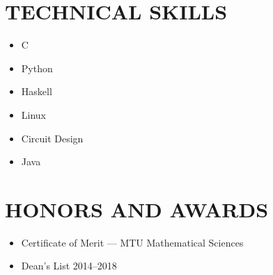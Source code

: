 \documentclass[letterpaper]{res}
\begin{document}
\begin{resume}
  \section{TECHNICAL SKILLS}
  \vspace{-1pt}
  \begin{multicols}{3}
    \begin{itemize} \itemsep1pt \parskip0pt 
      \item C
      \item Python
      \item Haskell
      \item Linux
      \item Circuit Design
      \item Java
    \end{itemize}
  \end{multicols}

  \section{HONORS AND AWARDS}
  \begin{itemize}
    \item Certificate of Merit --- MTU Mathematical Sciences
    \item Dean's List 2014--2018
  \end{itemize}

\end{resume}
\end{document}
